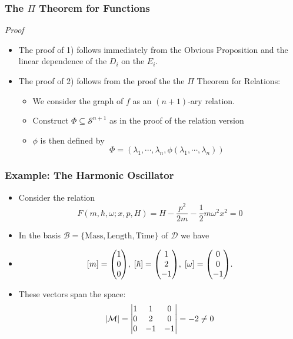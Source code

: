\documentclass{beamer}
\begin{document}
\begin{frame}
    \frametitle{The $\Pi$ Theorem for Functions}
    \alert{\textit{Proof}}
    \begin{itemize}
        \item<2-> The proof of 1) follows immediately from the Obvious Proposition and the linear dependence of the $D_i$ on the $E_i$.
        \item<3-> The proof of 2) follows from the proof the the $\Pi$ Theorem for Relations:
        \begin{itemize}
            \item<4-> We consider the graph of $f$ as an $(n+1)$-ary relation.
            \item<5-> Construct $\Phi \subseteq \mathcal{S}^{n+1}$ as in the proof of the relation version
            \item<6-> $\phi$ is then defined by \[ \Phi = (\lambda_1, \cdots, \lambda_n, \phi(\lambda_1, \cdots, \lambda_n)) \]
        \end{itemize}
    \end{itemize}
\end{frame}

\begin{frame}
    \frametitle{Example: The Harmonic Oscillator}
    \begin{itemize}
        \item<1-> Consider the relation \[ F(m, \hbar, \omega; x, p, H) = H - \frac{p^2}{2m} - \frac{1}{2}m\omega^2x^2 = 0 \]
        \item<2-> In the basis $\mathcal{B} = \{\text{Mass}, \text{Length}, \text{Time}\}$ of $\mathcal{D}$ we have
        \item<3-> \[ [m] = \mqty(1\\0\\0), \; [\hbar] = \mqty(1\\2\\-1), \; [\omega] = \mqty(0\\0\\-1). \]
        \item<4-> These vectors span the space: \[ |\mathcal{M}| = \mqty|1&1&0\\0&2&0\\0&-1&-1| =-2 \neq 0 \]
    \end{itemize}
\end{frame}
\end{document}
